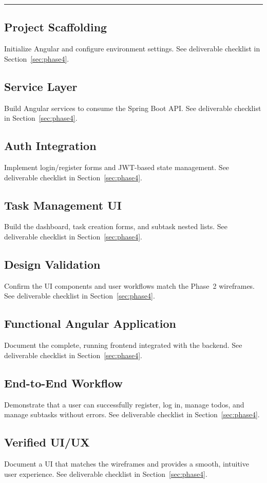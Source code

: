 \medskip
\noindent\rule{\linewidth}{0.4pt}
\medskip


\subsection{Project Scaffolding}\label{sec:fe-scaffolding}
Initialize Angular and configure environment settings.
See deliverable checklist in Section~\ref{sec:phase4}.

\subsection{Service Layer}\label{sec:service-layer}
Build Angular services to consume the Spring Boot API.
See deliverable checklist in Section~\ref{sec:phase4}.

\subsection{Auth Integration}\label{sec:auth-integration}
Implement login/register forms and JWT-based state management.
See deliverable checklist in Section~\ref{sec:phase4}.

\subsection{Task Management UI}\label{sec:task-ui}
Build the dashboard, task creation forms, and subtask nested lists.
See deliverable checklist in Section~\ref{sec:phase4}.

\subsection{Design Validation}\label{sec:fe-design-validation}
Confirm the UI components and user workflows match the Phase~2 wireframes.
See deliverable checklist in Section~\ref{sec:phase4}.

\subsection{Functional Angular Application}\label{sec:functional-angular}
Document the complete, running frontend integrated with the backend.
See deliverable checklist in Section~\ref{sec:phase4}.

\subsection{End-to-End Workflow}\label{sec:e2e-workflow}
Demonstrate that a user can successfully register, log in, manage todos, and manage subtasks without errors.
See deliverable checklist in Section~\ref{sec:phase4}.

\subsection{Verified UI/UX}\label{sec:verified-ui}
Document a UI that matches the wireframes and provides a smooth, intuitive user experience.
See deliverable checklist in Section~\ref{sec:phase4}.
